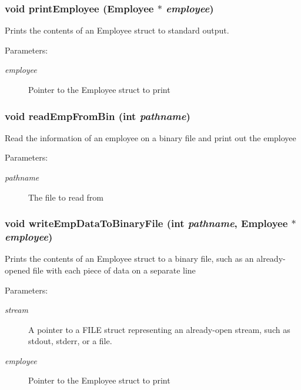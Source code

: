 \subsubsection{\setlength{\rightskip}{0pt plus 5cm}void print\-Employee (\bf{Employee} $\ast$ {\em employee})}\label{struct_8c_a28c4b8e4929dadc3d00cd55a2469e60}


Prints the contents of an Employee struct to standard output. \begin{Desc}
\item[Parameters:]
\begin{description}
\item[{\em employee}]Pointer to the Employee struct to print \end{description}
\end{Desc}
\subsubsection{\setlength{\rightskip}{0pt plus 5cm}void read\-Emp\-From\-Bin (int {\em pathname})}\label{struct_8c_b25b7aa9c6b7f289193249ea7b888fb9}


Read the information of an employee on a binary file and print out the employee \begin{Desc}
\item[Parameters:]
\begin{description}
\item[{\em pathname}]The file to read from \end{description}
\end{Desc}
\subsubsection{\setlength{\rightskip}{0pt plus 5cm}void write\-Emp\-Data\-To\-Binary\-File (int {\em pathname}, \bf{Employee} $\ast$ {\em employee})}\label{struct_8c_58744171738d60fc2d2f0cfda2350f12}


Prints the contents of an Employee struct to a binary file, such as an already-opened file with each piece of data on a separate line \begin{Desc}
\item[Parameters:]
\begin{description}
\item[{\em stream}]A pointer to a FILE struct representing an already-open stream, such as stdout, stderr, or a file. \item[{\em employee}]Pointer to the Employee struct to print \end{description}
\end{Desc}
